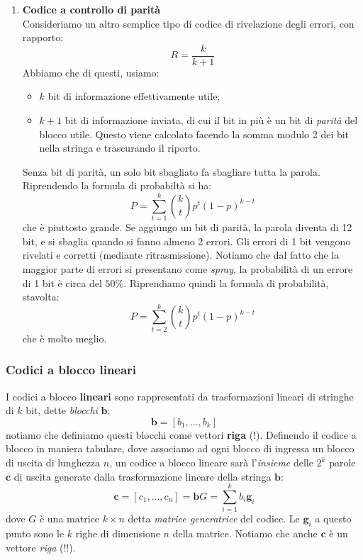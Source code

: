 \documentclass[a4paper,11pt]{article}
\begin{document}
\begin{enumerate}
\item \textbf{\textsf{Codice a controllo di parità}} \\
Consideriamo un altro semplice tipo di codice di rivelazione degli errori, con rapporto:
$$
R = \frac{k}{k + 1}
$$
Abbiamo che di questi, usiamo:
\begin{itemize}
	\item $k$ bit di informazione effettivamente utile;
	\item $k + 1$ bit di informazione inviata, di cui il bit in più è un bit di \textit{parità} del blocco utile. Questo viene calcolato facendo la somma modulo 2 dei bit nella stringa e trascurando il riporto.
\end{itemize}

Senza bit di parità, un solo bit sbagliato fa sbagliare tutta la parola. Riprendendo la formula di probabiltà si ha:
$$
P = \sum_{t = 1}^{k} \binom{k}{t} p^t (1 - p)^{k - t}
$$
che è piuttosto grande. Se aggiungo un bit di parità, la parola diventa di 12 bit, e si sbaglia quando si fanno almeno 2 errori. Gli errori di 1 bit vengono rivelati e corretti (mediante ritrasmissione). Notiamo che dal fatto che la maggior parte di errori si presentano come \textit{spray}, la probabilità di un errore di 1 bit è circa del $50 \%$. Riprendiamo quindi la formula di probabilità, stavolta:
$$
P = \sum_{t = 2}^{k} \binom{k}{t} p^t (1 - p)^{k - t}
$$
che è molto meglio.

\end{enumerate}

\subsubsection{Codici a blocco lineari}
I codici a blocco \textbf{lineari} sono rappresentati da trasformazioni lineari di stringhe di $k$ bit, dette \textit{blocchi} $\mathbf{b}$:
$$
\mathbf{b} = [ b_1, ..., b_k ]
$$
notiamo che definiamo questi blocchi come vettori \textbf{riga} (!).
Definendo il codice a blocco in maniera tabulare, dove associamo ad ogni blocco di ingressa un blocco di uscita di lunghezza $n$, un codice a blocco lineare sarà l'\textit{insieme} delle $2^k$ parole $\mathbf{c}$ di uscita generate dalla trasformazione lineare della stringa $\mathbf{b}$:
$$
\mathbf{c} = [c_1, ..., c_n] = \mathbf{b} G = \sum_{i = 1}^k b_i \mathbf{g}_i
$$
dove $G$ è una matrice $k \times n$ detta \textit{matrice generatrice} del codice. Le $\mathbf{g}_i$ a questo punto sono le $k$ righe di dimensione $n$ della matrice. Notiamo che anche $\mathbf{c}$ è un vettore \textit{riga} (!!).
\end{document}
